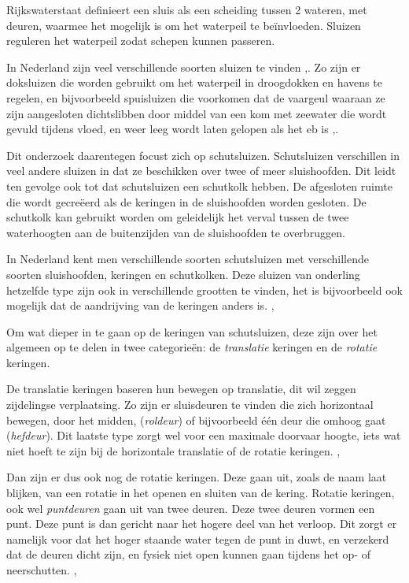 \documentclass[../verslag.tex]{subfiles}
\begin{document}
Rijkswaterstaat definieert een sluis als een scheiding tussen 2 wateren, met deuren, waarmee het mogelijk is om het waterpeil te beïnvloeden. Sluizen reguleren het waterpeil zodat schepen kunnen passeren. \cite{rws_2022}

In Nederland zijn veel verschillende soorten sluizen te vinden \cite{wsnoorderzijlvest_2021},\cite{arends_1994}. Zo zijn er doksluizen die worden gebruikt om het waterpeil in droogdokken en havens te regelen, en bijvoorbeeld spuisluizen die voorkomen dat de vaargeul waaraan ze zijn aangesloten dichtslibben door middel van een kom met zeewater die wordt gevuld tijdens vloed, en weer leeg wordt laten gelopen als het eb is \cite{wsnoorderzijlvest_2021},\cite{arends_1994}.

Dit onderzoek daarentegen focust zich op schutsluizen. Schutsluizen verschillen in veel andere sluizen in dat ze beschikken over twee of meer sluishoofden. Dit leidt ten gevolge ook tot dat schutsluizen een schutkolk hebben. De afgesloten ruimte die wordt gecreëerd als de keringen in de sluishoofden worden gesloten. De schutkolk kan gebruikt worden om geleidelijk het verval tussen de twee waterhoogten aan de buitenzijden van de sluishoofden te overbruggen. \cite{bezuijen_2000}

In Nederland kent men verschillende soorten schutsluizen met verschillende soorten sluishoofden, keringen en schutkolken. Deze sluizen van onderling hetzelfde type zijn ook in verschillende grootten te vinden, het is bijvoorbeeld ook mogelijk dat de aandrijving van de keringen anders is. \cite{bezuijen_2000}, \cite{arends_1994}

Om wat dieper in te gaan op de keringen van schutsluizen, deze zijn over het algemeen op te delen in twee categorieën: de \emph{translatie} keringen en de \emph{rotatie} keringen. \cite{bezuijen_2000}

De translatie keringen baseren hun bewegen op translatie, dit wil zeggen zijdelingse verplaatsing. Zo zijn er sluisdeuren te vinden die zich horizontaal bewegen, door het midden, (\emph{roldeur}) of bijvoorbeeld één deur die omhoog gaat (\emph{hefdeur}). Dit laatste type zorgt wel voor een maximale doorvaar hoogte, iets wat niet hoeft te zijn bij de horizontale translatie of de rotatie keringen. \cite{bezuijen_2000}, \cite{arends_1994}

Dan zijn er dus ook nog de rotatie keringen. Deze gaan uit, zoals de naam laat blijken, van een rotatie in het openen en sluiten van de kering. Rotatie keringen, ook wel \emph{puntdeuren} gaan uit van twee deuren. Deze twee deuren vormen een punt. Deze punt is dan gericht naar het hogere deel van het verloop. Dit zorgt er namelijk voor dat het hoger staande water tegen de punt in duwt, en verzekerd dat de deuren dicht zijn, en fysiek niet open kunnen gaan tijdens het op- of neerschutten. \cite{bezuijen_2000}, \cite{arends_1994} 
\end{document}
